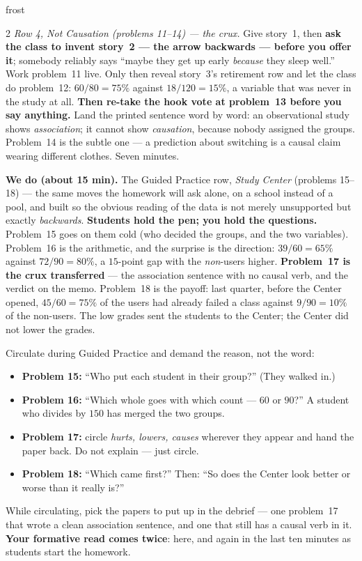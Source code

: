 \documentclass[10pt]{article}
\begin{document}
\begin{skillbox}{frost}
\begin{multicols}{2}
\emph{Row 4, Not Causation (problems 11--14) --- the crux.} Give story~1, then \textbf{ask the
class to invent story~2 --- the arrow backwards --- before you offer it}; somebody reliably says
``maybe they get up early \emph{because} they sleep well.'' Work problem~11 live. Only then
reveal story~3's retirement row and let the class do problem~12: $60/80 = 75\%$ against
$18/120 = 15\%$, a variable that was never in the study at all. \textbf{Then re-take the hook
vote at problem~13 before you say anything.} Land the printed sentence word by word: an
observational study shows \emph{association}; it cannot show \emph{causation}, because nobody
assigned the groups. Problem~14 is the subtle one --- a prediction about switching is a causal
claim wearing different clothes. Seven minutes.

\columnbreak
\textbf{We do (about 15 min).} The Guided Practice row, \emph{Study Center} (problems 15--18)
--- the same moves the homework will ask alone, on a school instead of a pool, and built so the
obvious reading of the data is not merely unsupported but exactly \emph{backwards}.
\textbf{Students hold the pen; you hold the questions.} Problem~15 goes on them cold (who
decided the groups, and the two variables). Problem~16 is the arithmetic, and the surprise is
the direction: $39/60 = 65\%$ against $72/90 = 80\%$, a $15$-point gap with the \emph{non}-users
higher. \textbf{Problem~17 is the crux transferred} --- the association sentence with no causal
verb, and the verdict on the memo. Problem~18 is the payoff: last quarter, before the Center
opened, $45/60 = 75\%$ of the users had already failed a class against $9/90 = 10\%$ of the
non-users. The low grades sent the students to the Center; the Center did not lower the grades.

Circulate during Guided Practice and demand the reason, not the word:
\begin{itemize}[leftmargin=1.1em, nosep]
  \item \textbf{Problem 15:} ``Who put each student in their group?'' (They walked in.)
  \item \textbf{Problem 16:} ``Which whole goes with which count --- $60$ or $90$?'' A student
        who divides by $150$ has merged the two groups.
  \item \textbf{Problem 17:} circle \emph{hurts, lowers, causes} wherever they appear and hand
        the paper back. Do not explain --- just circle.
  \item \textbf{Problem 18:} ``Which came first?'' Then: ``So does the Center look better or
        worse than it really is?''
\end{itemize}
While circulating, pick the papers to put up in the debrief --- one problem~17 that wrote a
clean association sentence, and one that still has a causal verb in it. \textbf{Your formative
read comes twice}: here, and again in the last ten minutes as students start the homework.
\end{multicols}
\end{skillbox}
\end{document}
